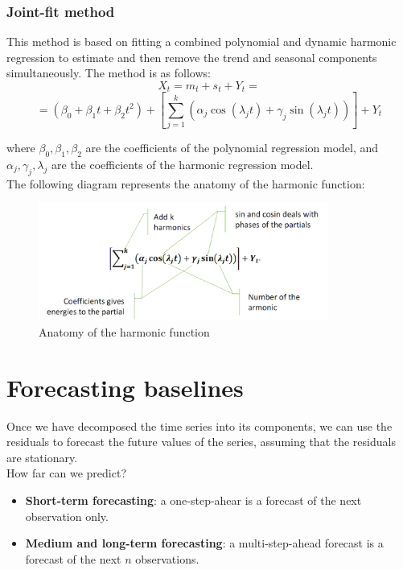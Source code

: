 \subsubsection{Joint-fit method}

This method is based on fitting a combined polynomial and dynamic harmonic regression
to estimate and then remove the trend and seasonal components simultaneously. 
The method is as follows:
$$X_t = m_t + s_t + Y_t =$$
$$=(\beta_0 +\beta_1 t + \beta_2 t^2) + \left[ \sum_{j=1}^k (\alpha_j \cos(\lambda_j t) + \gamma_j \sin(\lambda_j t)) \right] + Y_t$$

where $\beta_0, \beta_1, \beta_2$ are the coefficients of the polynomial regression
model, and $\alpha_j, \gamma_j, \lambda_j$ are the coefficients of the harmonic
regression model.\\

The following diagram represents the anatomy of the harmonic function:

\begin{figure}[H]
    \centering
    \includegraphics[width=0.85\textwidth]{figures/harmonic_function.png}
    \caption{Anatomy of the harmonic function}
    \label{fig:harmonic}
\end{figure}


\section{Forecasting baselines}

Once we have decomposed the time series into its components, we can use the residuals
to forecast the future values of the series, assuming that the residuals are stationary.\\

How far can we predict?
\begin{itemize}
    \item \textbf{Short-term forecasting}: a one-step-ahear is a forecast of the next
    observation only.
    \item \textbf{Medium and long-term forecasting}: a multi-step-ahead forecast is
    a forecast of the next $n$ observations.
\end{itemize}

